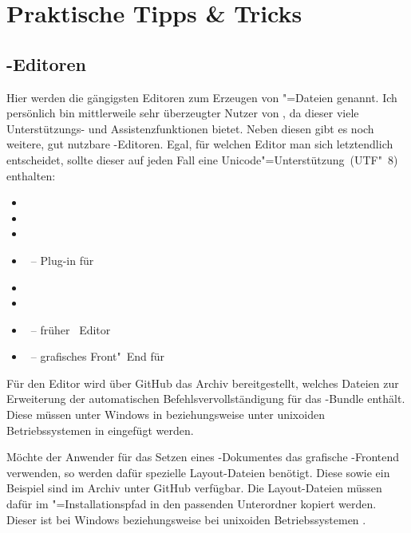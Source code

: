 \chapter{Praktische Tipps \& Tricks}
\label{sec:tips}
\newcommand*\TaT{\hyperref[sec:tips]{Tipps \& Tricks}}
\section{-Editoren}
\label{sec:tips:editor}
Hier werden die gängigsten Editoren zum Erzeugen von "=Dateien 
genannt. Ich persönlich bin mittlerweile sehr überzeugter Nutzer von 
, da dieser viele Unterstützungs- und 
Assistenzfunktionen bietet. Neben diesen gibt es noch weitere, gut nutzbare 
-Editoren. Egal, für welchen Editor man sich letztendlich 
entscheidet, sollte dieser auf jeden Fall eine Unicode"=Unterstützung~(UTF"~8) 
enthalten:
%
\begin{itemize}
\item {}
\item {}
\item {}
\item {}~-- Plug-in für 
\item {}
\item {}
\item {}~-- früher ~Editor
\item {}~-- grafisches Front"~End für 
\end{itemize}
%
Für den Editor wird über GitHub das Archiv
%
{} bereitgestellt, welches Dateien zur Erweiterung 
der automatischen Befehlsvervollständigung für das \TUDScript-Bundle enthält. 
Diese müssen unter Windows in  
beziehungsweise unter unixoiden Betriebssystemen in  
eingefügt werden.

Möchte der Anwender für das Setzen eines \TUDScript-Dokumentes das grafische 
-Frontend  verwenden, so werden dafür 
spezielle Layout-Dateien benötigt. Diese sowie ein Beispiel sind im Archiv 
%
{} unter GitHub verfügbar. Die Layout-Dateien müssen 
dafür im "=Installationspfad in den passenden 
Unterordner kopiert werden. Dieser ist bei Windows
beziehungsweise bei unixoiden Betriebssystemen .



